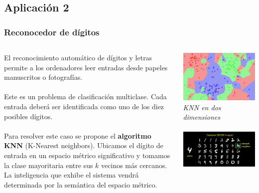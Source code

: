 \documentclass[8pt]{beamer}
\begin{document}
  \subsection{Aplicación 2}
    \begin{frame}
      \frametitle{Reconocedor de dígitos}
      \begin{columns}[T]
       \begin{column}{.5\textwidth}
	 \justifying
         El reconocimiento automático de dígitos y letras permite a los ordenadores
         leer entradas desde papeles manuscritos o fotografías.
         \\~\\
         Este es un problema de clasificación multiclase. Cada entrada deberá ser identificada
         como uno de los diez posibles dígitos.
         \\~\\
         Para resolver este caso se propone el \textbf{algoritmo KNN} (K-Nearest neighbors). 
         Ubicamos el dígito de entrada en un espacio métrico significativo y tomamos la clase mayoritaria 
         entre sus $k$ vecinos más cercanos. La inteligencia que exhibe el sistema vendrá
         determinada por la semántica del espacio métrico.
       \end{column}
       \begin{column}{.5\textwidth}
	  \begin{center}
	  \includegraphics[width=.8\textwidth]{imgs/knn.png} %
	  \\ \centering \textit{KNN en dos dimensiones}
	  \\~\\
	  \includegraphics[width=.8\textwidth]{imgs/digit_database.jpg} %

\end{center}
\end{column}
\end{columns}
\end{frame}
\end{document}
